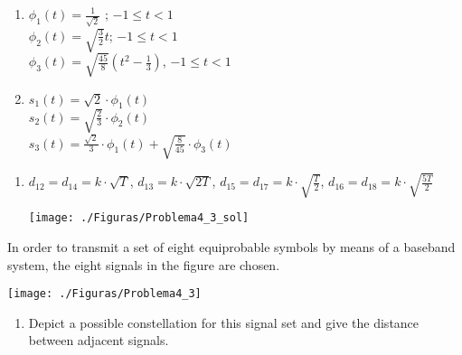 \documentclass[idioma,boletin]{uah}
\begin{document}
{
\begin{enumerate}
	\item $\phi_1(t) = \frac{1}{\sqrt{2}}$ ; $-1 \leq t < 1$\\
	 $\phi_2(t) = \sqrt{\frac{3}{2}}t$; $-1 \leq t < 1$\\
	 $\phi_3(t) = \sqrt{\frac{45}{8}}\left ( t^2 - \frac{1}{3}\right )$, $-1 \leq t < 1$
	\item $s_1(t) = \sqrt{2}\cdot \phi_1(t)$\\
		 $s_2(t)=\sqrt{\frac{2}{3}} \cdot \phi_2(t)$\\
		  $s_3(t) = \frac{\sqrt{2}}{3}\cdot \phi_1(t) + \sqrt{\frac{8}{45}} \cdot \phi_3(t)$
\end{enumerate}
}

\newpage

{
\begin{enumerate}
	\item $d_{12} = d_{14} = k \cdot \sqrt{T}$, $d_{13} = k\cdot \sqrt{2T}$, $d_{15}=d_{17} = k \cdot \sqrt{\frac{T}{2}}$, $d_{16}=d_{18} = k \cdot \sqrt{\frac{5T}{2}}$
	 
{\begin{figure*}[h!]\centering\texttt{[image: ./Figuras/Problema4\_3\_sol]}\end{figure*}}

\end{enumerate}
}
{

In order to transmit a set of eight equiprobable symbols by means of a baseband system, the eight signals in the figure are chosen.


{\begin{figure*}[h!]\centering\texttt{[image: ./Figuras/Problema4\_3]}\end{figure*}}


\begin{enumerate}
	\item Depict a possible constellation for this signal set and give the distance between adjacent signals.
\end{enumerate}

}
\end{document}
